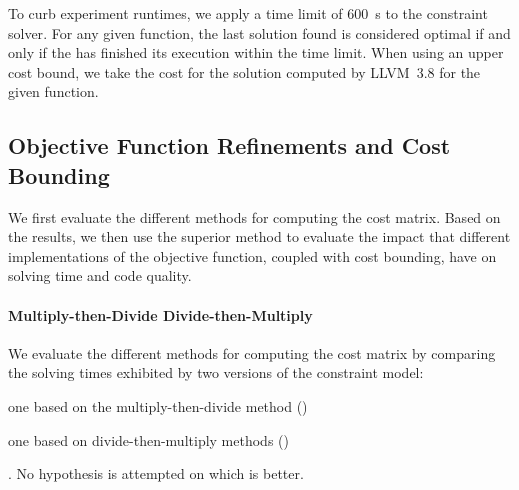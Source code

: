 To curb experiment runtimes, we apply a time limit of \SI{600}{\s} to the
\gls{constraint solver}.
%
For any given \gls{function}, the last \gls{solution} found is considered
optimal if and only if the  has finished its
execution within the time limit.
%
When using an upper cost bound, we take the cost for the \gls{solution} computed
by \mbox{\gls{LLVM} 3.8} for the given \gls{function}.


\subsection{Objective Function Refinements and Cost Bounding}

We first evaluate the different methods for computing the cost matrix.
%
Based on the results, we then use the superior method to evaluate the impact
that different implementations of the \gls{objective function}, coupled with
cost bounding, have on solving time and code quality.


\paragraph{Multiply-then-Divide \versus Divide-then-Multiply}

We evaluate the different methods for computing the cost matrix by
comparing the solving times exhibited by two versions of the \gls{constraint
  model}:
%
\begin{modelList}
  \item {}
    one based on the \gls{multiply-then-divide method}
    ()
  \item {}
    one based on \glspl{divide-then-multiply method}
    ()
\end{modelList}.
%
No hypothesis is attempted on which  is better.



